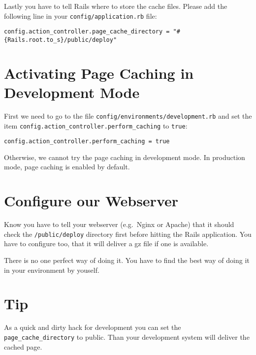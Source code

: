 \documentclass[a4paper]{book}
\begin{document}
Lastly you have to tell Rails where to store the cache files. Please add the following line in your \texttt{config/application.rb} file:

\begin{shaded}\begin{verbatim}
config.action_controller.page_cache_directory = "#{Rails.root.to_s}/public/deploy"
\end{verbatim}\end{shaded}

\section{Activating Page Caching in Development Mode}\label{activating-page-caching-in-development-mode}

First we need to go to the file \texttt{config/environments/development.rb} and set the item \texttt{config.action\_controller.perform\_caching} to \texttt{true}:

\begin{shaded}\begin{verbatim}
config.action_controller.perform_caching = true
\end{verbatim}\end{shaded}

Otherwise, we cannot try the page caching in development mode. In production mode, page caching is enabled by default.

\section{Configure our Webserver}\label{configure-our-webserver}

Know you have to tell your webserver (e.g.~Nginx or Apache) that it should check the \texttt{/public/deploy} directory first before hitting the Rails application. You have to configure too, that it will deliver a gz file if one is available.

There is no one perfect way of doing it. You have to find the best way of doing it in your environment by youself.

\section{Tip}\label{tip-20}

As a quick and dirty hack for development you can set the \texttt{page\_cache\_directory} to public. Than your development system will deliver the cached page.
\end{document}
